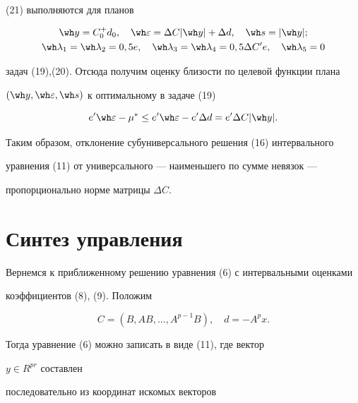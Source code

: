 (21) выполняются для планов 


\begin{gather*} 


\wh y=C^+_0d_0,\quad \wh\varepsilon=\Delta C|\wh y|+ 


\Delta d,\quad \wh s=|\wh y|;\\ 


\wh\lambda_1=\wh\lambda_2=0,5e,\quad 


\wh\lambda_3=\wh\lambda_4=0,5\Delta C'e,\quad 


\wh\lambda_5=0 


\end{gather*} 


задач (19),(20). Отсюда получим оценку близости по целевой функции плана 


$(\wh y,\wh\varepsilon,\wh s)$ к оптимальному в задаче (19) 


\begin{equation} 


e'\wh\varepsilon-\mu^*\le e'\wh\varepsilon- 


e'\Delta d=e'\Delta C|\wh y|. 


\end{equation} 


Таким образом, отклонение субуниверсального решения (16) интервального 


уравнения (11) от универсального --- наименьшего по сумме невязок --- 


пропорционально норме матрицы $\Delta C$. 


 


\section{Синтез управления} 


 


Вернемся к приближенному решению уравнения (6) с интервальными оценками 


коэффициентов (8), (9). Положим 


$$ 


C=(B,AB,\dotsc,A^{p-1}B),\quad d=-A^p x. 


$$ 


Тогда уравнение (6) можно записать в виде (11), где вектор 


$y\in R^{pr}$ составлен 


последовательно из координат искомых векторов 


